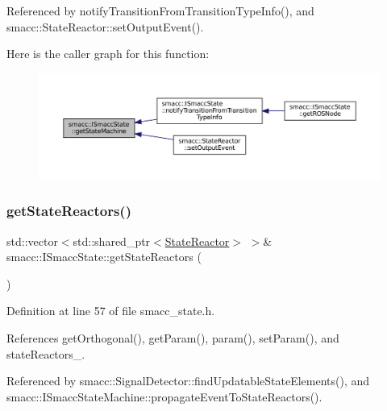 Referenced by notify\+Transition\+From\+Transition\+Type\+Info(), and smacc\+::\+State\+Reactor\+::set\+Output\+Event().

Here is the caller graph for this function\+:
\nopagebreak
\begin{figure}[H]
\begin{center}
\leavevmode
\includegraphics[width=350pt]{classsmacc_1_1ISmaccState_a562bb3f9a3ac16b8be71e4794c9e7523_icgraph}
\end{center}
\end{figure}
\mbox{\label{classsmacc_1_1ISmaccState_acc40f4b3dd02a39242c7e23fe13c3e16}} 
\subsubsection{\texorpdfstring{get\+State\+Reactors()}{getStateReactors()}}
{\footnotesize\ttfamily std\+::vector$<$std\+::shared\+\_\+ptr$<$\hyperlink{classsmacc_1_1StateReactor}{State\+Reactor}$>$ $>$\& smacc\+::\+I\+Smacc\+State\+::get\+State\+Reactors (\begin{DoxyParamCaption}{ }\end{DoxyParamCaption})\hspace{0.3cm}{\ttfamily [inline]}}



Definition at line 57 of file smacc\+\_\+state.\+h.



References get\+Orthogonal(), get\+Param(), param(), set\+Param(), and state\+Reactors\+\_\+.



Referenced by smacc\+::\+Signal\+Detector\+::find\+Updatable\+State\+Elements(), and smacc\+::\+I\+Smacc\+State\+Machine\+::propagate\+Event\+To\+State\+Reactors().


